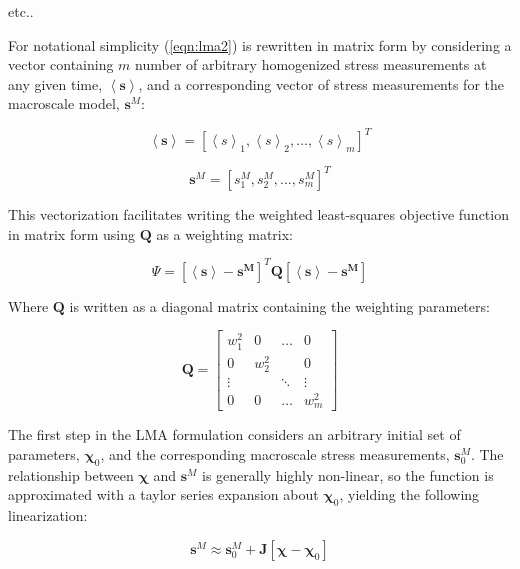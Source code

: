 etc..

For notational simplicity (\ref{eqn:lma2}) is rewritten in matrix form by considering a vector containing $m$ number of arbitrary homogenized stress measurements at any given time, $\left< \mathbf{s} \right>$, and a corresponding vector of stress measurements for the macroscale model, $\mathbf{s}^M$:

\begin{equation}
\left< \mathbf{s} \right>=\left[\left< s \right>_1, \left< s \right>_2, \dots, \left< s \right>_m \right]^T
\label{eqn:lma3}
\end{equation}

\begin{equation}
\mathbf{s}^M=\left[s^M_1, s^M_2, \dots, s^M_m \right]^T
\label{eqn:lma4}
\end{equation}

This vectorization facilitates writing the weighted least-squares objective function in matrix form using $\mathbf{Q}$ as a weighting matrix:

\begin{equation}
\Psi=\left[\left<\mathbf{s}\right>-\mathbf{s^M}\right]^T \mathbf{Q} \left[\left<\mathbf{s}\right>-\mathbf{s^M}\right]
\label{eqn:lma5}
\end{equation}

Where $\mathbf{Q}$ is written as a diagonal matrix containing the weighting parameters:

\begin{equation}
\mathbf{Q}=\begin{bmatrix}
w_1^2 & 0     & \dots  & 0\\ 
0     & w_2^2 &        & 0\\ 
\vdots&       & \ddots & \vdots \\ 
0     & 0     & \dots  & w_m^2
\end{bmatrix}
\label{eqn:lma6}
\end{equation}

The first step in the LMA formulation considers an arbitrary initial set of parameters, $\boldsymbol{\chi}_0$, and the corresponding macroscale stress measurements, $\mathbf{s}^M_0$. The relationship between $\boldsymbol{\chi}$ and $\mathbf{s}^M$ is generally highly non-linear, so the function is approximated with a taylor series expansion about $\boldsymbol{\chi}_0$, yielding the following linearization:

\begin{equation}
\mathbf{s}^M \approx \mathbf{s}^M_0 + \mathbf{J} \left[ \boldsymbol{\chi}-\boldsymbol{\chi}_0 \right]
\label{eqn:lma7}
\end{equation}

